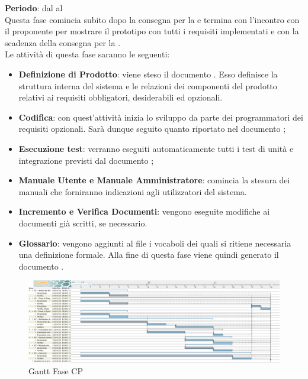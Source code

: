 	\textbf{Periodo}: dal  al  \\Questa fase comincia subito dopo la consegna per la  e termina con l'incontro con il proponente per mostrare il prototipo con tutti i requisiti implementati e con la scadenza della consegna per la . 
	\\Le attività di questa fase saranno le seguenti:
	\begin{itemize}
		\item\textbf{Definizione di Prodotto}: viene steso il documento . Esso definisce la struttura interna del sistema e le relazioni dei componenti del prodotto relativi ai requisiti obbligatori, desiderabili ed opzionali.
		\item \textbf{Codifica}: con quest'attività inizia lo sviluppo da parte dei programmatori dei requisiti opzionali. Sarà dunque seguito quanto riportato nel documento ;
		\item \textbf{Esecuzione test}: verranno eseguiti automaticamente tutti i test di unità e integrazione previsti dal documento ;
		\item\textbf{Manuale Utente e Manuale Amministratore}: comincia la stesura dei manuali che forniranno indicazioni agli utilizzatori del sistema.
		\item\textbf{Incremento e Verifica Documenti}: vengono eseguite modifiche ai documenti già scritti, se necessario.
		\item\textbf{Glossario}: vengono aggiunti al file  i vocaboli dei quali si ritiene necessaria una definizione formale. Alla fine di questa fase viene quindi generato il documento .
	\end{itemize}
	\begin{figure}[H]\centering
		\includegraphics[width=\textwidth]{PianoDiProgetto/Pics/FaseCP.png}
	\caption{Gantt Fase CP}
\end{figure}
